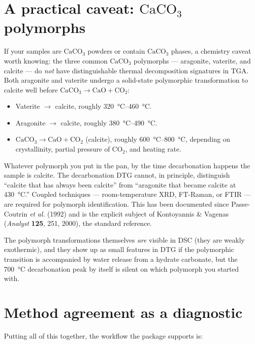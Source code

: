 \documentclass[11pt]{article}
\begin{document}
\section{A practical caveat: $\mathrm{CaCO}_3$ polymorphs}

If your samples are $\mathrm{CaCO}_3$ powders or contain
$\mathrm{CaCO}_3$ phases, a chemistry caveat worth knowing: the three
common $\mathrm{CaCO}_3$ polymorphs --- aragonite, vaterite, and
calcite --- do \emph{not} have distinguishable thermal decomposition
signatures in TGA. Both aragonite and vaterite undergo a solid-state
polymorphic transformation to calcite well before
$\mathrm{CaCO}_3 \to \mathrm{CaO} + \mathrm{CO}_2$:

\begin{itemize}
  \item Vaterite $\to$ calcite, roughly \qtyrange{320}{460}{\celsius}.
  \item Aragonite $\to$ calcite, roughly \qtyrange{380}{490}{\celsius}.
  \item $\mathrm{CaCO}_3 \to \mathrm{CaO} + \mathrm{CO}_2$ (calcite),
        roughly \qtyrange{600}{800}{\celsius}, depending on crystallinity,
        partial pressure of $\mathrm{CO}_2$, and heating rate.
\end{itemize}

Whatever polymorph you put in the pan, by the time decarbonation
happens the sample is calcite. The decarbonation DTG cannot, in
principle, distinguish ``calcite that has always been calcite'' from
``aragonite that became calcite at \qty{430}{\celsius}.''  Coupled techniques
--- room-temperature XRD, FT-Raman, or FTIR --- are required for
polymorph identification. This has been documented since
Passe-Coutrin \emph{et al.} (1992) and is the explicit subject of
Kontoyannis \& Vagenas (\emph{Analyst} \textbf{125}, 251, 2000), the
standard reference.

The polymorph transformations themselves \emph{are} visible in DSC
(they are weakly exothermic), and they show up as small features in
DTG if the polymorphic transition is accompanied by water release
from a hydrate carbonate, but the \qty{700}{\celsius} decarbonation peak by
itself is silent on which polymorph you started with.

\section{Method agreement as a diagnostic}

Putting all of this together, the workflow the package supports is:
\end{document}
